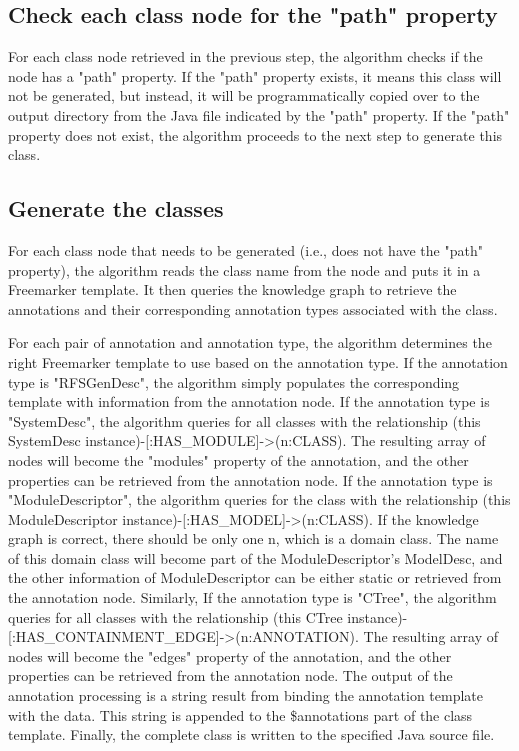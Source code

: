 \documentclass[runningheads]{llncs}
\begin{document}
\subsection{Check each class node for the "path" property}
For each class node retrieved in the previous step, the algorithm checks if the node has a "path" property. If the "path" property exists, it means this class will not be generated, but instead, it will be programmatically copied over to the output directory from the Java file indicated by the "path" property.  If the "path" property does not exist, the algorithm proceeds to the next step to generate this class.

\subsection{Generate the classes}
For each class node that needs to be generated (i.e., does not have the "path" property), the algorithm reads the class name from the node and puts it in a Freemarker template. It then queries the knowledge graph to retrieve the annotations and their corresponding annotation types associated with the class.

For each pair of annotation and annotation type, the algorithm determines the right Freemarker template to use based on the annotation type. If the annotation type is "RFSGenDesc", the algorithm simply populates the corresponding template with information from the annotation node. If the annotation type is "SystemDesc", the algorithm queries for all classes with the relationship (this SystemDesc instance)-[:HAS\_MODULE]->(n:CLASS). The resulting array of nodes will become the "modules" property of the annotation, and the other properties can be retrieved from the annotation node. If the annotation type is "ModuleDescriptor", the algorithm queries for the class with the relationship (this ModuleDescriptor instance)-[:HAS\_MODEL]->(n:CLASS). If the knowledge graph is correct, there should be only one n, which is a domain class. The name of this domain class will become part of the ModuleDescriptor's ModelDesc, and the other information of ModuleDescriptor can be either static or retrieved from the annotation node. Similarly, If the annotation type is "CTree", the algorithm queries for all classes with the relationship (this CTree instance)-[:HAS\_CONTAINMENT\_EDGE]->(n:ANNOTATION). The resulting array of nodes will become the "edges" property of the annotation, and the other properties can be retrieved from the annotation node. The output of the annotation processing is a string result from binding the annotation template with the data. This string is appended to the \${annotations} part of the class template. Finally, the complete class is written to the specified Java source file.
\end{document}
